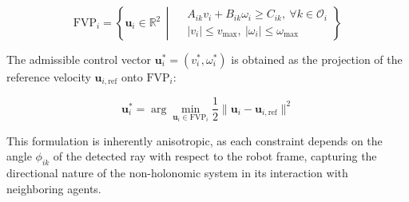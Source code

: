 \begin{equation}
    \text{FVP}_i = \left\{ \mathbf{u}_i \in \mathbb{R}^2 \,\middle|\,
    \begin{aligned}
        &A_{ik} v_i + B_{ik} \omega_i \geq C_{ik},\ \forall k \in \mathcal{O}_i \\
        &|v_i| \leq v_{\max},\ |\omega_i| \leq \omega_{\max}
    \end{aligned}
    \right\}
    \label{eq:fvp}
\end{equation}

The admissible control vector $\mathbf{u}_i^* = (v_i^*, \omega_i^*)$ is obtained as the projection of the reference velocity $\mathbf{u}_{i,\text{ref}}$ onto $\text{FVP}_i$:

\begin{equation}
    \mathbf{u}_i^* = \arg\min_{\mathbf{u}_i \in \text{FVP}_i} \frac{1}{2} \| \mathbf{u}_i - \mathbf{u}_{i,\text{ref}} \|^2
    \label{eq:projection}
\end{equation}

\noindent This formulation is inherently anisotropic, as each constraint depends on the angle $\phi_{ik}$ of the detected ray with respect to the robot frame, capturing the directional nature of the non-holonomic system in its interaction with neighboring agents.